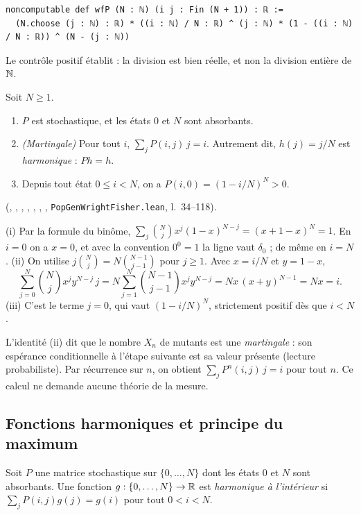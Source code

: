 \begin{leanbox}
\begin{lstlisting}[language=Lean]
noncomputable def wfP (N : ℕ) (i j : Fin (N + 1)) : ℝ :=
  (N.choose (j : ℕ) : ℝ) * ((i : ℕ) / N : ℝ) ^ (j : ℕ) * (1 - ((i : ℕ) / N : ℝ)) ^ (N - (j : ℕ))
\end{lstlisting}
Le contrôle positif  établit  : la division est bien
réelle, et non la division entière de $\mathbb{N}$.
\end{leanbox}

\begin{proposition}\label{ch4:prop:wfbase}
Soit $N\ge1$.
\begin{enumerate}[label=(\roman*),itemsep=1pt]
\item $P$ est stochastique, et les états $0$ et $N$ sont absorbants.
\item \emph{(Martingale)} Pour tout $i$, $\sum_jP(i,j)\,j=i$. Autrement dit, $h(j)=j/N$ est \emph{harmonique} :
$Ph=h$.
\item Depuis tout état $0\le i<N$, on a $P(i,0)=(1-i/N)^N>0$.
\end{enumerate}
\tierA{} (, , , , ,
, , \texttt{PopGenWrightFisher.lean}, l.~34--118).
\end{proposition}

\begin{humanproof}
(i) Par la formule du binôme, $\sum_j\binom Nj x^j(1-x)^{N-j}=(x+1-x)^N=1$. En $i=0$ on a $x=0$, et avec la
convention $0^0=1$ la ligne vaut $\delta_0$ ; de même en $i=N$.
(ii) On utilise $j\binom Nj=N\binom{N-1}{j-1}$ pour $j\ge1$. Avec $x=i/N$ et $y=1-x$,
\[
\sum_{j=0}^N\binom Nj x^jy^{N-j}\,j=N\sum_{j=1}^{N}\binom{N-1}{j-1}x^jy^{N-j}=Nx\,(x+y)^{N-1}=Nx=i .
\]
(iii) C'est le terme $j=0$, qui vaut $(1-i/N)^N$, strictement positif dès que $i<N$.
\end{humanproof}

L'identité (ii) dit que le nombre $X_n$ de mutants est une \emph{martingale} : son espérance conditionnelle à
l'étape suivante est sa valeur présente \tierC{} (lecture probabiliste). Par récurrence sur $n$, on obtient
$\sum_jP^n(i,j)\,j=i$ pour tout $n$. Ce calcul ne demande aucune théorie de la mesure.

\subsection{Fonctions harmoniques et principe du maximum}
\begin{definition}
Soit $P$ une matrice stochastique sur $\{0,\dots,N\}$ dont les états $0$ et $N$ sont absorbants. Une fonction
$g:\{0,\dots,N\}\to\mathbb{R}$ est \emph{harmonique à l'intérieur} si $\sum_jP(i,j)g(j)=g(i)$ pour tout $0<i<N$.
\end{definition}

